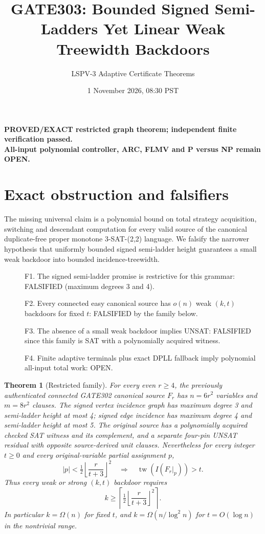 \documentclass[11pt]{article}
\title{GATE303: Bounded Signed Semi-Ladders Yet Linear Weak Treewidth Backdoors}
\author{LSPV-3 Adaptive Certificate Theorems}
\date{1 November 2026, 08:30 PST}
\newtheorem{theorem}{Theorem}
\begin{document}
\maketitle
\begin{center}
\textbf{PROVED/EXACT restricted graph theorem; independent finite verification passed.}\\
\textbf{All-input polynomial controller, ARC, FLMV and P versus NP remain OPEN.}
\end{center}
\section*{Exact obstruction and falsifiers}
The missing universal claim is a polynomial bound on total strategy acquisition, switching and descendant computation for every valid source of the canonical duplicate-free proper monotone 3-SAT-(2,2) language. We falsify the narrower hypothesis that uniformly bounded signed semi-ladder height guarantees a small weak backdoor into bounded incidence-treewidth.
\begin{description}
\item[] F1. The signed semi-ladder promise is restrictive for this grammar: FALSIFIED (maximum degrees 3 and 4).
\item[] F2. Every connected easy canonical source has $o(n)$ weak $(k,t)$ backdoors for fixed $t$: FALSIFIED by the family below.
\item[] F3. The absence of a small weak backdoor implies UNSAT: FALSIFIED since this family is SAT with a polynomially acquired witness.
\item[] F4. Finite adaptive terminals plus exact DPLL fallback imply polynomial all-input total work: OPEN.
\end{description}
\begin{theorem}[Restricted family]
For every even $r\ge4$, the previously authenticated connected GATE302 canonical source $F_r$ has $n=6r^2$ variables and $m=8r^2$ clauses. The signed vertex incidence graph has maximum degree 3 and semi-ladder height at most 4; signed edge incidence has maximum degree 4 and semi-ladder height at most 5. The original source has a polynomially acquired checked SAT witness and its complement, and a separate four-pin UNSAT residual with opposite source-derived unit clauses. Nevertheless for every integer $t\ge0$ and every original-variable partial assignment $p$,
\[
|p|<\tfrac12\left\lfloor\frac r{t+3}\right\rfloor^2
\quad\Longrightarrow\quad
\operatorname{tw}(I(F_r|_p))>t .
\]
Thus every weak or strong $(k,t)$ backdoor requires
\[
\boxed{k\ge\left\lceil\tfrac12\left\lfloor\frac r{t+3}\right\rfloor^2\right\rceil.}
\]
In particular $k=\Omega(n)$ for fixed $t$, and $k=\Omega(n/\log^2 n)$ for $t=O(\log n)$ in the nontrivial range.
\end{theorem}
\end{document}
